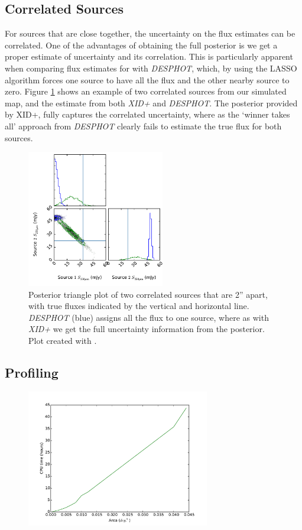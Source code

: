 \documentclass[useAMS,usenatbib]{mnras}
\begin{document}
\subsection{Correlated Sources}
For sources that are close together, the uncertainty on the flux estimates can be correlated. One of the advantages of obtaining the full posterior is we get a proper estimate of uncertainty and its correlation. This is particularly apparent when comparing flux estimates for with \emph{DESPHOT}, which, by using the LASSO algorithm forces one source to have all the flux and the other nearby source to zero. Figure \ref{fig:corr} shows an example of two correlated sources from our simulated map, and the estimate from both \emph{XID+} and \emph{DESPHOT}. The posterior provided by XID+, fully captures the correlated uncertainty, where as the `winner takes all' approach from \emph{DESPHOT} clearly fails to estimate the true flux for both sources.
 
\begin{figure} 
\includegraphics[width=6cm]{example_tri_DESHPOT_XIDp.pdf}
\caption{Posterior triangle plot of two correlated sources that are 2'' apart, with true fluxes indicated by the vertical and horizontal line. \emph{DESPHOT} (blue) assigns all the flux to one source, where as with \emph{XID+} we get the full uncertainty information from the posterior. Plot created with \protect\cite{triangle}.}\label{fig:corr}
\end{figure}
\subsection{Profiling}
\begin{figure} 
\includegraphics[width=8cm]{profiletest.pdf}
\caption{}\label{fig:prof}
\end{figure}
\end{document}
